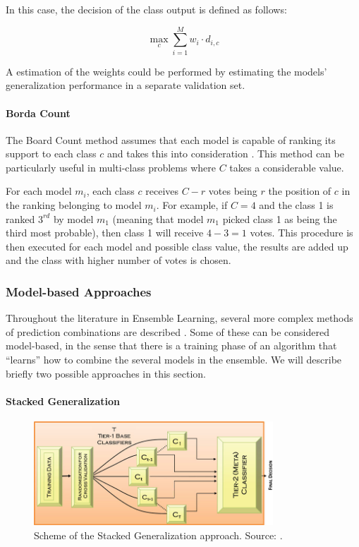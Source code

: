 In this case, the decision of the class output is defined as follows:

\begin{equation}
\max_c \sum_{i = 1}^{M} w_i \cdot d_{i,c}
\end{equation}

A estimation of the weights could be performed by estimating the models' generalization performance in a separate validation set.

\paragraph{Borda Count}\mbox{}

The Board Count method assumes that each model is capable of ranking its support to each class $c$ and takes this into consideration \cite{Polikar2012a}. This method can be particularly useful in multi-class problems where $C$ takes a considerable value.

For each model $m_i$, each class $c$ receives $C-r$ votes being $r$ the position of $c$ in the ranking belonging to model $m_i$.
For example, if $C = 4$ and the class 1 is ranked $3^{rd}$ by model $m_1$ (meaning that model $m_1$ picked class 1 as being the third most probable), then class 1 will receive $4-3 = 1$ votes.
This procedure is then executed for each model and possible class value, the results are added up and the class with higher number of votes is chosen.

\subsubsection{Model-based Approaches}

Throughout the literature in Ensemble Learning, several more complex methods of prediction combinations are described \cite{Polikar2012a}.
Some of these can be considered model-based, in the sense that there is a training phase of an algorithm that ``learns'' how to combine the several models in the ensemble.
We will describe briefly two possible approaches in this section.

\paragraph{Stacked Generalization}\mbox{}

\begin{figure}[ht!]
	\centering
	\includegraphics[width=0.8\textwidth]{figures/stacking}
	\caption{Scheme of the Stacked Generalization approach. Source: \cite{Polikar2012a}.}
	\label{fig:stacking}
\end{figure}

